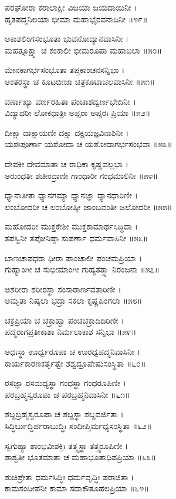ಪರಘೋರಾ ಕರಾಲಾಕ್ಷೀ ವಿಜಯಾ ಜಯದಾಯಿನೀ ।\\
ಹೃತಪದ್ಮನಿಲಯಾ ಭೀಮಾ ಮಹಾಭೈರವನಾದಿನೀ ॥೪೯॥

ಆಕಾಶಲಿಂಗಸಂಭೂತಾ ಭುವನೋದ್ಯಾನವಾಸಿನೀ ।\\
ಮಹತ್ಸೂಕ್ಷ್ಮಾ ಚ ಕಂಕಾಲೀ ಭೀಮರೂಪಾ ಮಹಾಬಲಾ ॥೫೦॥

ಮೇನಕಾಗರ್ಭಸಂಭೂತಾ ತಪ್ತಕಾಂಚನಸನ್ನಿಭಾ ।\\
ಅಂತರಸ್ಥಾ ಚ ಕೂಟಬೀಜಾ ಚಿತ್ರಕೂಟಾಚಲವಾಸಿನೀ ॥೫೧॥

ವರ್ಣಾಖ್ಯಾ ವರ್ಣರಹಿತಾ ಪಂಚಾಶದ್ವರ್ಣಭೇದಿನೀ ।\\
ವಿದ್ಯಾಧರೀ ಲೋಕಧಾತ್ರೀ ಅಪ್ಸರಾ ಅಪ್ಸರಃ ಪ್ರಿಯಾ ॥೫೨॥

ದೀಕ್ಷಾ ದಾಕ್ಷಾಯಣೀ ದಕ್ಷಾ ದಕ್ಷಯಜ್ಞವಿನಾಶಿನೀ ।\\
ಯಶಃಪೂರ್ಣಾ ಯಶೋದಾ ಚ ಯಶೋದಾಗರ್ಭಸಂಭವಾ ॥೫೩॥

ದೇವಕೀ ದೇವಮಾತಾ ಚ ರಾಧಿಕಾ ಕೃಷ್ಣವಲ್ಲಭಾ ।\\
ಅರುಂಧತೀ ಶಚೀಂದ್ರಾಣೀ ಗಾಂಧಾರೀ ಗಂಧಮಾಲಿನೀ ॥೫೪॥

ಧ್ಯಾನಾತೀತಾ ಧ್ಯಾನಗಮ್ಯಾ ಧ್ಯಾನಜ್ಞಾ ಧ್ಯಾನಧಾರಿಣೀ ।\\
ಲಂಬೋದರೀ ಚ ಲಂಬೋಷ್ಠೀ ಜಾಂಬವಂತೀ ಜಲೋದರೀ ॥೫೫॥

ಮಹೋದರೀ ಮುಕ್ತಕೇಶೀ ಮುಕ್ತಕಾಮಾರ್ಥಸಿದ್ಧಿದಾ ।\\
ತಪಸ್ವಿನೀ ತಪೋನಿಷ್ಠಾ ಸುಪರ್ಣಾ ಧರ್ಮವಾಸಿನೀ ॥೫೬॥

ಬಾಣಚಾಪಧರಾ ಧೀರಾ ಪಾಂಚಾಲೀ ಪಂಚಮಪ್ರಿಯಾ ।\\
ಗುಹ್ಯಾಂಗೀ ಚ ಸುಭೀಮಾಂಗೀ ಗುಹ್ಯತತ್ತ್ವಾ ನಿರಂಜನಾ ॥೫೭॥

ಅಶರೀರಾ ಶರೀರಸ್ಥಾ ಸಂಸಾರಾರ್ಣವತಾರಿಣೀ ।\\
ಅಮೃತಾ ನಿಷ್ಕಲಾ ಭದ್ರಾ ಸಕಲಾ ಕೃಷ್ಣಪಿಂಗಲಾ ॥೫೮॥

ಚಕ್ರಪ್ರಿಯಾ ಚ ಚಕ್ರಾಹ್ವಾ ಪಂಚಚಕ್ರಾದಿದಿರಿಣೀ ।\\
ಪದ್ಮರಾಗಪ್ರತೀಕಾಶಾ ನಿರ್ಮಲಾಕಾಶ ಸನ್ನಿಭಾ ॥೫೯॥

ಅಧಃಸ್ಥಾ ಊರ್ಧ್ವರೂಪಾ ಚ ಊರಧ್ವಪದ್ಮನಿವಾಸಿನೀ ।\\
ಕಾರ್ಯಕಾರಣಕರ್ತೃತ್ವೇ ಶಶ್ವದ್ರೂಪೇಷುಸಂಸ್ಥಿತಾ ॥೬೦॥

ರಸಜ್ಞಾ ರಸಮಧ್ಯಸ್ಥಾ ಗಂಧಸ್ಥಾ ಗಂಧರೂಪಿಣೀ ।\\
ಪರಬ್ರಹ್ಮಸ್ವರೂಪಾ ಚ ಪರಬ್ರಹ್ಮನಿವಾಸಿನೀ ॥೬೧॥

ಶಬ್ದಬ್ರಹ್ಮಸ್ವರೂಪಾ ಚ ಶಬ್ದಸ್ಥಾ ಶಬ್ದವರ್ಜಿತಾ ।\\
ಸಿದ್ಧಿರ್ಬುದ್ಧಿರ್ಪರಾಬುದ್ಧಿಃ ಸಂದೀಪ್ತಿರ್ಮಧ್ಯಸಂಸ್ಥಿತಾ ॥೬೨॥

ಸ್ವಗುಹ್ಯಾ ಶಾಂಭವೀಶಕ್ತಿಃ ತತ್ತ್ವಸ್ಥಾ ತತ್ತ್ವರೂಪಿಣೀ ।\\
ಶಾಶ್ವತೀ ಭೂತಮಾತಾ ಚ ಮಹಾಭೂತಾಧಿಪಪ್ರಿಯಾ ॥೬೩॥

ಶುಚಿಪ್ರೇತಾ ಧರ್ಮಸಿದ್ಧಿಃ ಧರ್ಮವೃದ್ಧಿಃ ಪರಾಜಿತಾ ।\\
ಕಾಮಸಂದೀಪನೀ ಕಾಮಾ ಸದಾಕೌತೂಹಲಪ್ರಿಯಾ ॥೬೪॥

